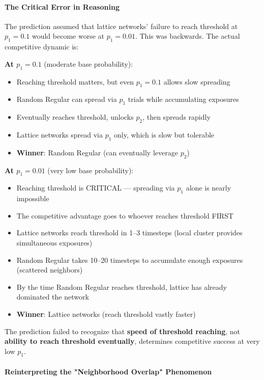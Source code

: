 \documentclass[12pt,a4paper]{article}
\begin{document}
\paragraph{The Critical Error in Reasoning}

The prediction assumed that lattice networks' failure to reach threshold at $p_1=0.1$ would become worse at $p_1=0.01$. This was backwards. The actual competitive dynamic is:

\textbf{At $p_1=0.1$} (moderate base probability):
\begin{itemize}
    \item Reaching threshold matters, but even $p_1=0.1$ allows slow spreading
    \item Random Regular can spread via $p_1$ trials while accumulating exposures
    \item Eventually reaches threshold, unlocks $p_2$, then spreads rapidly
    \item Lattice networks spread via $p_1$ only, which is slow but tolerable
    \item \textbf{Winner}: Random Regular (can eventually leverage $p_2$)
\end{itemize}

\textbf{At $p_1=0.01$} (very low base probability):
\begin{itemize}
    \item Reaching threshold is CRITICAL --- spreading via $p_1$ alone is nearly impossible
    \item The competitive advantage goes to whoever reaches threshold FIRST
    \item Lattice networks reach threshold in 1--3 timesteps (local cluster provides simultaneous exposures)
    \item Random Regular takes 10--20 timesteps to accumulate enough exposures (scattered neighbors)
    \item By the time Random Regular reaches threshold, lattice has already dominated the network
    \item \textbf{Winner}: Lattice networks (reach threshold vastly faster)
\end{itemize}

The prediction failed to recognize that \textbf{speed of threshold reaching}, not \textbf{ability to reach threshold eventually}, determines competitive success at very low $p_1$.

\paragraph{Reinterpreting the "Neighborhood Overlap" Phenomenon}
\end{document}
